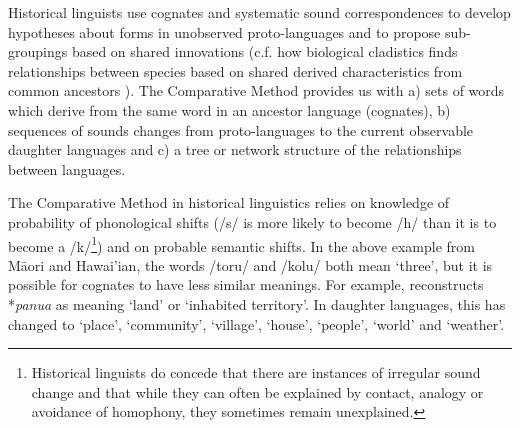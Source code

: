 \documentclass[draft,10pt]{article} %
\begin{document}

Historical linguists use cognates and systematic sound correspondences to develop hypotheses about forms in unobserved proto-languages and to propose sub-groupings based on shared innovations (c.f. how biological cladistics finds relationships between species based on shared derived characteristics from common ancestors \citep[16-17]{maclaurin2008biodiversity}). The Comparative Method provides us with a) sets of words which derive from the same word in an ancestor language (cognates), b) sequences of sounds changes from proto-languages to the current observable daughter languages and c) a tree or network structure of the relationships between languages. 
 
The Comparative Method in historical linguistics relies on knowledge of probability of phonological shifts (/s/ is more likely to become /h/ than it is to become a /k/\footnote{Historical linguists do concede that there are instances of irregular sound change \citep{blust1996neogrammarian, campbell1996sound} and that while they can often be explained by contact, analogy or avoidance of homophony, they sometimes remain unexplained.}) and on probable semantic shifts. In the above example from M\={a}ori and Hawai'ian, the words /toru/ and /kolu/ both mean `three', but it is possible for cognates to have less similar meanings. For example, \citet{pawley2005meaning} reconstructs *\emph{panua} as meaning `land' or `inhabited territory'. In daughter languages, this has changed to `place', `community', `village', `house', `people', `world' and `weather'.


\end{document}
